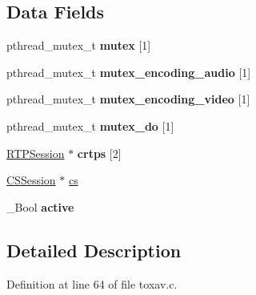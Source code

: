 \subsection*{Data Fields}
\begin{DoxyCompactItemize}
\item 
\hypertarget{struct___tox_av_call_ab4293016252c4d4e63549b0773fa0f33}{pthread\+\_\+mutex\+\_\+t {\bfseries mutex} \mbox{[}1\mbox{]}}\label{struct___tox_av_call_ab4293016252c4d4e63549b0773fa0f33}

\item 
\hypertarget{struct___tox_av_call_ac4c859b6e4ff8e175151fbd0a763e414}{pthread\+\_\+mutex\+\_\+t {\bfseries mutex\+\_\+encoding\+\_\+audio} \mbox{[}1\mbox{]}}\label{struct___tox_av_call_ac4c859b6e4ff8e175151fbd0a763e414}

\item 
\hypertarget{struct___tox_av_call_a89e9fe0c3fef08c502e53ad423dccc34}{pthread\+\_\+mutex\+\_\+t {\bfseries mutex\+\_\+encoding\+\_\+video} \mbox{[}1\mbox{]}}\label{struct___tox_av_call_a89e9fe0c3fef08c502e53ad423dccc34}

\item 
\hypertarget{struct___tox_av_call_acc4203df7776b6dfe0e5c3922a35e5b0}{pthread\+\_\+mutex\+\_\+t {\bfseries mutex\+\_\+do} \mbox{[}1\mbox{]}}\label{struct___tox_av_call_acc4203df7776b6dfe0e5c3922a35e5b0}

\item 
\hypertarget{struct___tox_av_call_a2e84bee4a1898deac1f63f47235378eb}{\hyperlink{struct___r_t_p_session}{R\+T\+P\+Session} $\ast$ {\bfseries crtps} \mbox{[}2\mbox{]}}\label{struct___tox_av_call_a2e84bee4a1898deac1f63f47235378eb}

\item 
\hyperlink{struct___c_s_session}{C\+S\+Session} $\ast$ \hyperlink{struct___tox_av_call_ae88a02b5082b346e4c90541186364e99}{cs}
\item 
\hypertarget{struct___tox_av_call_a215df53a125f9b848dc883d9a1164430}{\+\_\+\+Bool {\bfseries active}}\label{struct___tox_av_call_a215df53a125f9b848dc883d9a1164430}

\end{DoxyCompactItemize}


\subsection{Detailed Description}


Definition at line 64 of file toxav.\+c.



